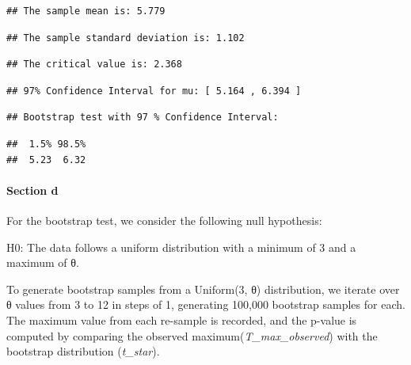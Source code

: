 \documentclass[
  11pt,
]{article}
\begin{document}
\begin{verbatim}
## The sample mean is: 5.779
\end{verbatim}

\begin{verbatim}
## The sample standard deviation is: 1.102
\end{verbatim}

\begin{verbatim}
## The critical value is: 2.368
\end{verbatim}

\begin{verbatim}
## 97% Confidence Interval for mu: [ 5.164 , 6.394 ]
\end{verbatim}

\begin{verbatim}
## Bootstrap test with 97 % Confidence Interval:
\end{verbatim}

\begin{verbatim}
##  1.5% 98.5% 
##  5.23  6.32
\end{verbatim}

\paragraph{Section d}\label{section-d}

For the bootstrap test, we consider the following null hypothesis:

H0: The data follows a uniform distribution with a minimum of 3 and a
maximum of θ.

To generate bootstrap samples from a Uniform(3, θ) distribution, we
iterate over θ values from 3 to 12 in steps of 1, generating 100,000
bootstrap samples for each. The maximum value from each re-sample is
recorded, and the p-value is computed by comparing the observed
maximum(\emph{T\_max\_observed}) with the bootstrap distribution
(\emph{t\_star}).
\end{document}
